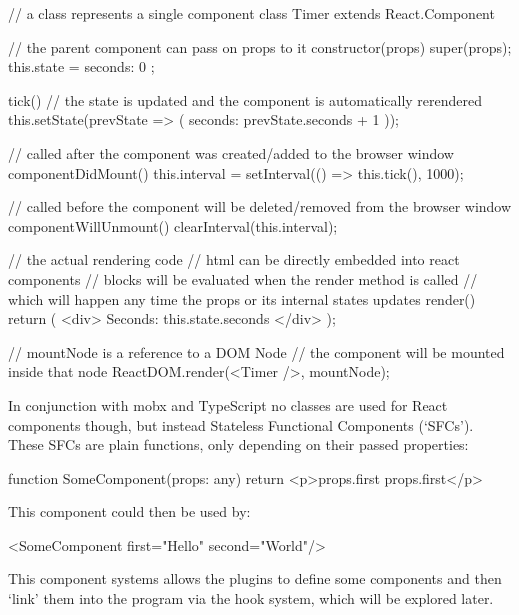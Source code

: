 \begin{typescript}
// a class represents a single component
class Timer extends React.Component {
  // the parent component can pass on props to it
  constructor(props) {
    super(props);
    this.state = { seconds: 0 };
  }

  tick() {
    //  the state is updated and the component is automatically rerendered
    this.setState(prevState => ({
      seconds: prevState.seconds + 1
    }));
  }

  // called after the component was created/added to the browser window
  componentDidMount() {
    this.interval = setInterval(() => this.tick(), 1000);
  }

  // called before the component will be deleted/removed from the browser window
  componentWillUnmount() {
    clearInterval(this.interval);
  }

  // the actual rendering code
  // html can be directly embedded into react components
  // {} blocks will be evaluated when the render method is called
  // which will happen any time the props or its internal states updates
  render() {
    return (
      <div>
        Seconds: {this.state.seconds}
      </div>
    );
  }
}

// mountNode is a reference to a DOM Node
// the component will be mounted inside that node
ReactDOM.render(<Timer />, mountNode);
\end{typescript}
In conjunction with mobx and TypeScript no classes are used for React components
though, but instead Stateless Functional Components
(`SFCs'\cite*{ikeuchi_react_2017}). These SFCs are plain functions, only
depending on their passed properties:
\begin{typescript}
function SomeComponent(props: any) {
 return <p>{props.first} {props.first}</p>
}
\end{typescript}
This component could then be used by:
\begin{typescript}
 <SomeComponent first="Hello" second="World"/>
\end{typescript}
This component systems allows the plugins to define some components and then
`link' them into the program via the hook system, which will be explored later.
